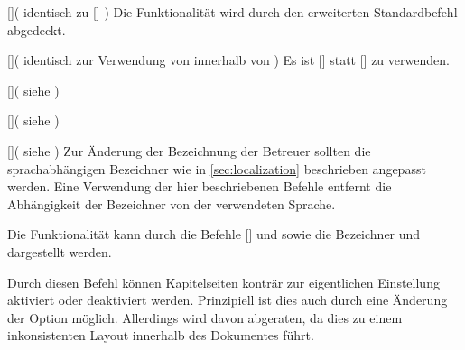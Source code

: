 \begin{Entity*}{}
\begin{Declaration}{[]}(%
  identisch zu []%
)
\printdeclarationlist%
%
Die Funktionalität wird durch den erweiterten Standardbefehl  
abgedeckt.
\end{Declaration}

\begin{Declaration}{[]}(%
  identisch zur Verwendung von  innerhalb von %
)
\printdeclarationlist%
%
Es ist []
statt [] zu verwenden.
\end{Declaration}

\begin{Declaration}{[]}(%
  siehe %
)
\begin{Declaration}{[]}(%
  siehe %
)
\begin{Declaration}{[]}(%
  siehe %
)
\printdeclarationlist%
%
Zur Änderung der Bezeichnung der Betreuer sollten die sprachabhängigen 
Bezeichner wie in \autoref{sec:localization} beschrieben angepasst werden. Eine 
Verwendung der hier beschriebenen Befehle entfernt die Abhängigkeit der 
Bezeichner von der verwendeten Sprache.
\end{Declaration}
\end{Declaration}
\end{Declaration}

\begin{Declaration}{}
\printdeclarationlist%
%
Die Funktionalität kann durch die Befehle [] und 
 sowie die Bezeichner  und 
 dargestellt werden.
\end{Declaration}

\begin{Declaration}{}
\printdeclarationlist%
%
Durch diesen Befehl können Kapitelseiten konträr zur eigentlichen Einstellung 
aktiviert oder deaktiviert werden. Prinzipiell ist dies auch durch eine 
Änderung der Option  möglich. Allerdings wird davon 
abgeraten, da dies zu einem inkonsistenten Layout innerhalb des Dokumentes 
führt.
\end{Declaration}


\end{Entity*}
